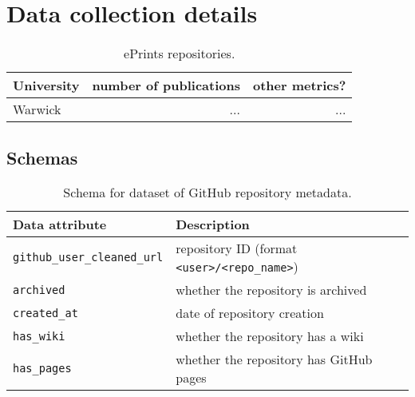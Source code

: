 \documentclass[10pt,a4paper]{scrartcl}
\begin{document}
%
%

\appendix

\section{Data collection details}

\begin{table}[h]
    \centering
    \begin{tabular}{|l|r|r|}
        \hline
        University & number of publications & other metrics? \\
        \hline
        Warwick & ... & ...\\
        \hline
    \end{tabular}
    \caption{ePrints repositories.}
    \label{table:eprints}
\end{table}

\subsection*{Schemas}
\label{section:app_schemas_collection}


\begin{table}
    \centering
    \begin{tabular}{l|l}
        \hline
        Data attribute & Description \\
        \hline
        \verb|github_user_cleaned_url| & repository ID (format \verb|<user>/<repo_name>|) \\
        \verb|archived| & whether the repository is archived \\
        \verb|created_at| & date of repository creation \\
        \verb|has_wiki| & whether the repository has a wiki \\
        \verb|has_pages| & whether the repository has GitHub pages \\
        \hline
    \end{tabular}
    \caption{Schema for dataset of GitHub repository metadata.}
    \label{table:metadata}
\end{table}
\end{document}
